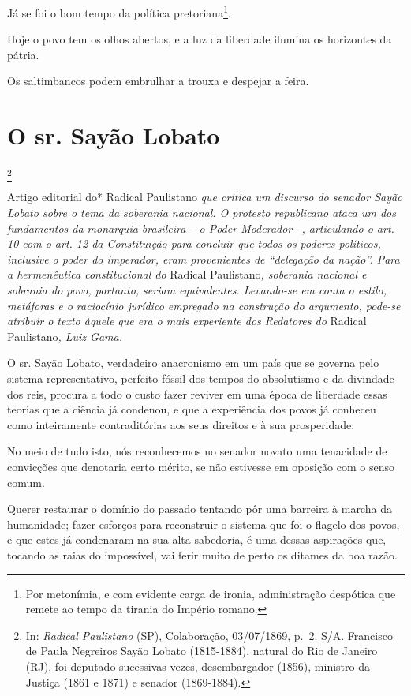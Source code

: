 Já se foi o bom tempo da política pretoriana\footnote{Por metonímia, e
  com evidente carga de ironia, administração despótica que remete ao
  tempo da tirania do Império romano.}.

Hoje o povo tem os olhos abertos, e a luz da liberdade ilumina os
horizontes da pátria.

Os saltimbancos podem embrulhar a trouxa e despejar a feira.

\chapter{O sr. Sayão Lobato}\footnote{In: \emph{Radical Paulistano} (SP),
  Colaboração, 03/07/1869, p.~2. S/A. Francisco de Paula Negreiros Sayão
  Lobato (1815-1884), natural do Rio de Janeiro (RJ), foi deputado
  sucessivas vezes, desembargador (1856), ministro da Justiça (1861 e
  1871) e senador (1869-1884).}

\begin{didascalia}
Artigo editorial do* Radical Paulistano \emph{que critica um discurso do
senador Sayão Lobato sobre o tema da soberania nacional. O protesto
republicano ataca um dos fundamentos da monarquia brasileira -- o Poder
Moderador --, articulando o art. 10 com o art. 12 da Constituição para
concluir que todos os poderes políticos, inclusive o poder do imperador,
eram provenientes de ``delegação da nação''. Para a hermenêutica
constitucional do} Radical Paulistano\emph{, soberania nacional e
sobrania do povo, portanto, seriam equivalentes. Levando-se em conta o
estilo, metáforas e o raciocínio jurídico empregado na construção do
argumento, pode-se atribuir o texto àquele que era o mais experiente dos
Redatores do} Radical Paulistano\emph{, Luiz Gama.}
\end{didascalia}

\asterisc{}

O sr. Sayão Lobato, verdadeiro anacronismo em um país que se governa
pelo sistema representativo, perfeito fóssil dos tempos do absolutismo e
da divindade dos reis, procura a todo o custo fazer reviver em uma época
de liberdade essas teorias que a ciência já condenou, e que a
experiência dos povos já conheceu como inteiramente contraditórias aos
seus direitos e à sua prosperidade.

No meio de tudo isto, nós reconhecemos no senador novato uma tenacidade
de convicções que denotaria certo mérito, se não estivesse em oposição
com o senso comum.

Querer restaurar o domínio do passado tentando pôr uma barreira à marcha
da humanidade; fazer esforços para reconstruir o sistema que foi o
flagelo dos povos, e que estes já condenaram na sua alta sabedoria, é
uma dessas aspirações que, tocando as raias do impossível, vai ferir
muito de perto os ditames da boa razão.

